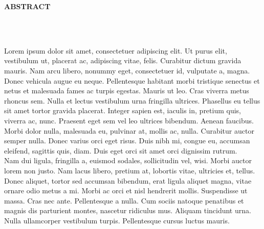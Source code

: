 
\begin{center}

\end{center}

\begin{center}
{{\bf\fontsize{14pt}{14.5pt}\selectfont \uppercase{ABSTRACT}}}
\end{center}

\doublespacing
{}



\begin{center}
	\begin{doublespace}
{\fontsize{14pt}{14.5pt}\selectfont {Title of Dissertation/Thesis}}\\
		{\fontsize{14pt}{14.5pt}\selectfont {Student Full Name}}\\
	\end{doublespace}
\end{center}


Lorem ipsum dolor sit amet, consectetuer adipiscing elit. Ut purus elit, vestibulum ut, placerat ac, adipiscing vitae, felis. Curabitur dictum gravida mauris. Nam
arcu libero, nonummy eget, consectetuer id, vulputate a, magna. Donec vehicula
augue eu neque. Pellentesque habitant morbi tristique senectus et netus et malesuada fames ac turpis egestas. Mauris ut leo. Cras viverra metus rhoncus sem.
Nulla et lectus vestibulum urna fringilla ultrices. Phasellus eu tellus sit amet tortor gravida placerat. Integer sapien est, iaculis in, pretium quis, viverra ac, nunc.
Praesent eget sem vel leo ultrices bibendum. Aenean faucibus. Morbi dolor nulla,
malesuada eu, pulvinar at, mollis ac, nulla. Curabitur auctor semper nulla. Donec
varius orci eget risus. Duis nibh mi, congue eu, accumsan eleifend, sagittis quis,
diam. Duis eget orci sit amet orci dignissim rutrum. \\
Nam dui ligula, fringilla a, euismod sodales, sollicitudin vel, wisi. Morbi auctor
lorem non justo. Nam lacus libero, pretium at, lobortis vitae, ultricies et, tellus.
Donec aliquet, tortor sed accumsan bibendum, erat ligula aliquet magna, vitae
ornare odio metus a mi. Morbi ac orci et nisl hendrerit mollis. Suspendisse ut
massa. Cras nec ante. Pellentesque a nulla. Cum sociis natoque penatibus et
magnis dis parturient montes, nascetur ridiculus mus. Aliquam tincidunt urna.
Nulla ullamcorper vestibulum turpis. Pellentesque cursus luctus mauris.
